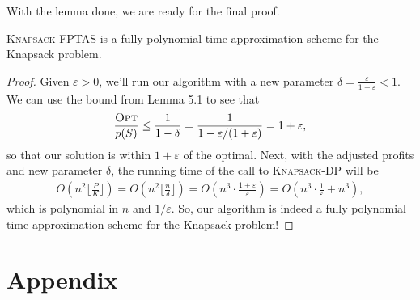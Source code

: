 \documentclass{article}
\newenvironment{theorem}[2][Theorem]{\begin{trivlist}
\item[\hskip \labelsep {\bfseries #1}\hskip \labelsep {\bfseries #2.}]}{\end{trivlist}}
\begin{document}
\noindent With the lemma done, we are ready for the final proof.

\begin{theorem}{5.2}{}
    \textsc{Knapsack-FPTAS} is a fully polynomial time approximation scheme for the Knapsack problem.
    
    \begin{proof}
        Given $\varepsilon > 0$, we'll run our algorithm with a new parameter $\delta = \frac{\varepsilon}{1 + \varepsilon} < 1$. We can use the bound from Lemma 5.1 to see that
        \begin{align*}
            \frac{\textsc{Opt}}{p(S)} \leq \frac{1}{1-\delta}= \frac{1}{1 - \varepsilon/(1+\varepsilon)} = 1 + \varepsilon,
        \end{align*}
        so that our solution is within $1 + \varepsilon$ of the optimal. Next, with the adjusted profits and new parameter $\delta$, the running time of the call to \textsc{Knapsack-DP} will be
        \begin{align*}
            O\left(n^2 \Big\lfloor \frac{P}{K} \Big\rfloor\right) = O\left(n^2 \Big\lfloor \frac{n}{\delta} \Big\rfloor\right) = O\left(n^3 \cdot \frac{1+\varepsilon}{\varepsilon}\right) = O \left( n^3 \cdot \frac{1}{\varepsilon} + n^3 \right),
        \end{align*}
        which is polynomial in $n$ and $1/\varepsilon$. So, our algorithm is indeed a fully polynomial time approximation scheme for the Knapsack problem!
    \end{proof}
\end{theorem}
\newpage


\section*{Appendix}
\end{document}
